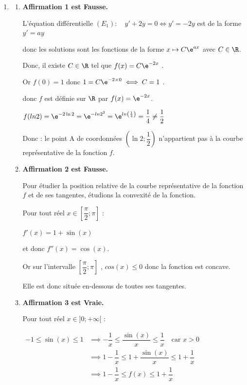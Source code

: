 \begin{enumerate}
\item 
	\begin{enumerate}
	\item  	\textbf{Affirmation 1  est Fausse. } 
	
	L'équation différentielle \quad $\left(E_{1}\right): \quad y'+2 y=0 \iff y'=-2y$ est de la forme $y'=ay$ 
	
donc les  solutions sont les fonctions de la forme $x\mapsto C\e^{ax}$ avec $C\in\R$. 

Donc, il existe $C\in \R$ tel que $f(x)= C \e^{-2x}$ .

Or $f(0)=1$ donc $1=C\e^{-2\times 0} \iff C=1$ .

donc $f$ est définie sur $\R$ par $f(x)=\e^{-2x}$. 

$f(ln 2) = \e^{-2\ln 2} = \e^{ -ln 2^2}= \e^{ln \left(\frac{1}{4}\right)}= \dfrac{1}{4} \neq \dfrac{1}{2}$

Donc : le point A de coordonnées $\left(\ln 2 ; \dfrac{1}{2}\right)$ n'appartient pas à la courbe représentative de la fonction $f$.



	\item	\textbf{Affirmation 2  est  Fausse. } 
	
Pour étudier la position relative de la courbe représentative de la fonction $f$ et de ses tangentes, étudions la convexité de la fonction. 

Pour tout réel $x\in \left[\dfrac{\pi}{2} ; \pi\right]$  : 

$f'(x) = 1 + \sin(x)$ 

et donc   $f''(x)= \cos(x)$.

Or sur l'intervalle $\left[\dfrac{\pi}{2} ; \pi\right]$ , $cos(x) \leq 0$ donc la fonction est concave. 

Elle est donc située en-dessous de toutes ses tangentes. 





	\item 	\textbf{Affirmation 3  est  Vraie. }
	
	
	Pour tout réel  $x\in ] 0 ;+\infty[$ : 
	
	$\begin{aligned}
		-1 \leqslant \sin(x) \leqslant 1 &\implies  -\dfrac{1}{x} \leqslant  \dfrac{\sin (x)}{x} \leqslant \dfrac{1}{x}  \quad \text{car } x>0 \\
	&	\implies  1 -\dfrac{1}{x} \leqslant  1 + \dfrac{\sin (x)}{x} \leqslant 1 +\dfrac{1}{x}  \\
	&	\implies  1 -\dfrac{1}{x} \leqslant  f(x)  \leqslant 1 +\dfrac{1}{x}  \\
	\end{aligned}$
	

\end{enumerate}
\end{enumerate}
